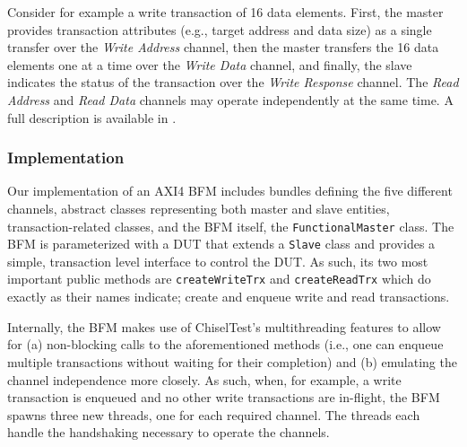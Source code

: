 \documentclass[conference]{IEEEtran}
\newcommand{\martin}[1]{{\color{blue} Martin: #1}}
\renewcommand{\martin}[1]{}
\begin{document}

\martin{Is it really specified that write address has to be sent before the data?
I guess those channels are independent.}
Consider for example a write transaction of 16 data elements. First, the master provides transaction attributes (e.g., target address and data size) as a single transfer over the \textit{Write Address} channel, then the master transfers the 16 data elements one at a time over the \textit{Write Data} channel, and finally, the slave indicates the status of the transaction over the \textit{Write Response} channel. The \textit{Read Address} and \textit{Read Data} channels may operate independently at the same time. A full description is available in \cite{axi4standard}.

\subsubsection{Implementation}
Our implementation of an AXI4 BFM includes bundles defining the five different channels, abstract classes representing both master and slave entities, transaction-related classes, and the BFM itself, the \texttt{FunctionalMaster} class. The BFM is parameterized with a DUT that extends a \texttt{Slave} class and provides a simple, transaction level interface to control the DUT. As such, its two most important public methods are \texttt{createWriteTrx} and \texttt{createReadTrx} which do exactly as their names indicate; create and enqueue write and read transactions.

Internally, the BFM makes use of ChiselTest's multithreading features to allow for (a) non-blocking calls to the aforementioned methods (i.e., one can enqueue multiple transactions without waiting for their completion) and (b) emulating the channel independence more closely. As such, when, for example, a write transaction is enqueued and no other write transactions are in-flight, the BFM spawns three new threads, one for each required channel. The threads each handle the handshaking necessary to operate the channels.
\end{document}
